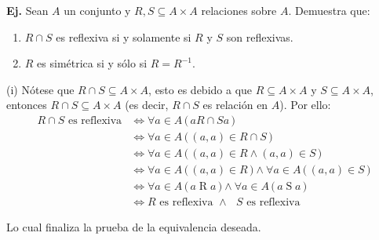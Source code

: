 \documentclass[letterpaper,DIV=14,headsepline,12pt]{scrartcl}
\makeatletter
\newcounter{Ejer}
\newcommand{\pts}{}
\newenvironment{ejercicio}[1]{\noindent
    \ifthenelse{\equal{#1}{1} \OR \equal{#1}{+1}}{\renewcommand{\pts}{\textbf{(#1 pt)}}}{\renewcommand{\pts}{\textbf{(#1 pts)}}}\textbf{Ej. \theEjer} \pts\stepcounter{Ejer}}{\vspace{.3cm}}
\renewenvironment{proof}[1][]{%
        \par\pushQED{\qed}%
        \normalfont\topsep6pt \partopsep0pt %
        \trivlist
        \item[\hskip\labelsep
                \textbf{\textit{Demostración.}}%
        ]#1
        }{%
        \popQED\endtrivlist\@endpefalse
    }
\makeatother
\begin{document}
    \begin{ejercicio}{1}
        Sean $A$ un conjunto y $R,S \subseteq A \times A$ relaciones sobre $A$. Demuestra que:
        \begin{enumerate}
            \item $R \cap S$ es reflexiva si y solamente si $R$ y $S$ son reflexivas.
            \item $R$ es simétrica si y sólo si $R=R^{-1}$.
        \end{enumerate}
    \end{ejercicio}
    \begin{proof}
        (i) Nótese que $R \cap S \subseteq A \times A$, esto es debido a que $R \subseteq A \times A$ y $S \subseteq A \times A$, entonces $R \cap S \subseteq A \times A$ (es decir, $R \cap S$ es relación en $A$). Por ello:
        \begin{align*}
            R \cap S \text{ es reflexiva} & \Leftrightarrow \forall a \in A \,\big(\, a \mathrel{R \cap S} a \,\big) \tag*{Def. de reflexividad} \\
            & \Leftrightarrow \forall a \in A \,\big(\, (a,a) \in R \cap S \,\big) \tag*{Notación} \\
            & \Leftrightarrow \forall a \in A \,\big(\, (a,a) \in R \land (a,a) \in S \,\big) \tag*{Def. de intersección} \\
            & \Leftrightarrow \forall a \in A \,\big(\, (a,a) \in R \,\big) \land \forall a \in A \,\big(\, (a,a) \in S \,\big) \tag*{$\forall$ respeta conjunciones} \\
            & \Leftrightarrow \forall a \in A \,\big(\, a \mathrel{R} a \,\big) \land \forall a \in A \,\big(\, a \mathrel{S} a \,\big) \tag*{Notación} \\
             & \Leftrightarrow R \text{ es reflexiva } \land \text{ } S \text{ es reflexiva} \tag*{Def. de reflexividad}
        \end{align*}
        
        Lo cual finaliza la prueba de la equivalencia deseada.


\end{proof}
\end{document}

